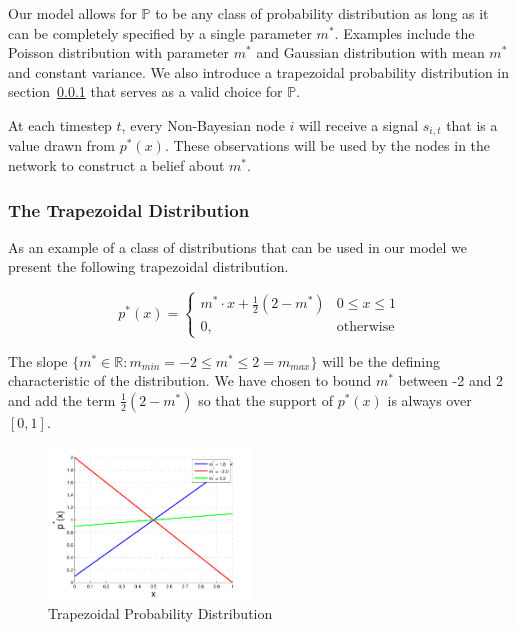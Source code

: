 \documentclass[letterpaper, 11pt, conference]{ieeeconf}
\begin{document}
Our model allows for $\mathbb{P}$ to be any class of probability distribution as long as it can be completely specified by a single parameter $m^*$.  Examples include the Poisson distribution with parameter $m^*$ and Gaussian distribution with mean $m^*$ and constant variance.  We also introduce a trapezoidal probability distribution in section~\ref{sec:trapezoidal_distribution} that serves as a valid choice for $\mathbb{P}$.

At each timestep $t$, every Non-Bayesian node $i$ will receive a signal $s_{i,t}$ that is a value drawn from $p^*(x)$.  These observations will be used by the nodes in the network to construct a belief about $m^*$.

\subsubsection{The Trapezoidal Distribution}
\label{sec:trapezoidal_distribution}

As an example of a class of distributions that can be used in our model we present the following trapezoidal distribution.

\begin{equation}
p^*(x)=\begin{cases}
m^* \cdot x + \frac{1}{2}(2-m^*) & 0 \le x \le 1 \\
0, & \text{otherwise}
\end{cases}
\end{equation}

The slope $\{ m^* \in \mathbb{R} : m_{min} = -2 \le m^* \le 2 = m_{max} \}$ will be the defining characteristic of the distribution.  We have chosen to bound $m^*$ between -2 and 2 and add the term $\frac{1}{2}(2-m^*)$ so that the support of $p^*(x)$  is always over $[0,1]$.

\begin{figure}[h]
\centering
\includegraphics[width=0.48\textwidth]{trapezoidalDistribution}
\caption{Trapezoidal Probability Distribution}
\label{fig:trapezoidal}
\end{figure}
\end{document}
